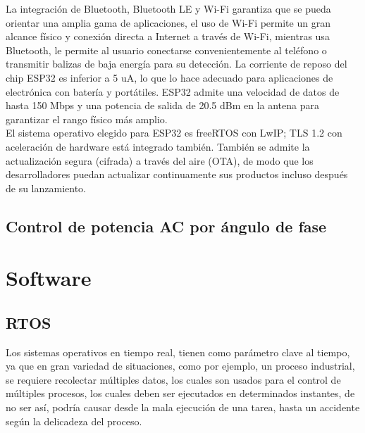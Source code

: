 La integración de Bluetooth, Bluetooth LE y Wi-Fi garantiza que se pueda orientar una amplia gama de aplicaciones, el uso de Wi-Fi permite un gran alcance físico y conexión directa a Internet a través de Wi-Fi, mientras usa Bluetooth, le permite al usuario conectarse convenientemente al teléfono o transmitir balizas de baja energía para su detección. La corriente de reposo del chip ESP32 es inferior a 5 uA, lo que lo hace adecuado para aplicaciones de electrónica con batería y portátiles. ESP32 admite una velocidad de datos de hasta 150 Mbps y una potencia de salida de 20.5 dBm en la antena para garantizar el rango físico más amplio.\\

El sistema operativo elegido para ESP32 es freeRTOS con LwIP; TLS 1.2 con aceleración de hardware está integrado también. También se admite la actualización segura (cifrada) a través del aire (OTA), de modo que los desarrolladores puedan actualizar continuamente sus productos incluso después de su lanzamiento. \\


\subsection{Control de potencia AC por ángulo de fase}



\section{Software}

\subsection{RTOS}

\cite{SO} Los sistemas operativos en tiempo real, tienen como parámetro clave al tiempo, ya que en gran variedad de situaciones, como por ejemplo, un proceso industrial, se requiere recolectar múltiples datos, los cuales son usados para el control de múltiples procesos, los cuales deben ser ejecutados en determinados instantes, de no ser así, podría causar desde la mala ejecución de una tarea, hasta un accidente según la delicadeza del proceso.\\ 


